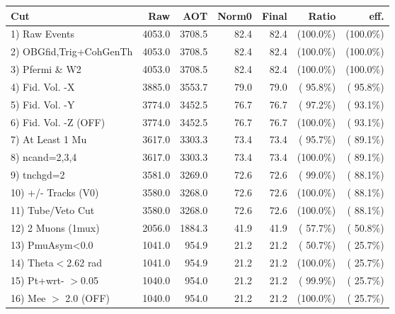 \begin{table}[h!]\centering
 \begin{tabular}{||l||r|r|r|r|r|r||}
 \hline
 \hline
 Cut & Raw & AOT & Norm0 & Final & Ratio & eff.       \\
 \hline
  1) Raw Events           &       4053.0 &       3708.5 &         82.4 &         82.4 & (100.0\%) & (100.0\%) \\
  2) OBGfid,Trig+CohGenTh &       4053.0 &       3708.5 &         82.4 &         82.4 & (100.0\%) & (100.0\%) \\
  3) Pfermi \& W2         &       4053.0 &       3708.5 &         82.4 &         82.4 & (100.0\%) & (100.0\%) \\
  4) Fid. Vol. -X         &       3885.0 &       3553.7 &         79.0 &         79.0 & ( 95.8\%) & ( 95.8\%) \\
  5) Fid. Vol. -Y         &       3774.0 &       3452.5 &         76.7 &         76.7 & ( 97.2\%) & ( 93.1\%) \\
  6) Fid. Vol. -Z (OFF)   &       3774.0 &       3452.5 &         76.7 &         76.7 & (100.0\%) & ( 93.1\%) \\
  7) At Least 1 Mu        &       3617.0 &       3303.3 &         73.4 &         73.4 & ( 95.7\%) & ( 89.1\%) \\
  8) ncand=2,3,4          &       3617.0 &       3303.3 &         73.4 &         73.4 & (100.0\%) & ( 89.1\%) \\
  9) tnchgd=2             &       3581.0 &       3269.0 &         72.6 &         72.6 & ( 99.0\%) & ( 88.1\%) \\
 10) +/- Tracks (V0)      &       3580.0 &       3268.0 &         72.6 &         72.6 & (100.0\%) & ( 88.1\%) \\
 11) Tube/Veto Cut        &       3580.0 &       3268.0 &         72.6 &         72.6 & (100.0\%) & ( 88.1\%) \\
 12) 2 Muons (1mux)       &       2056.0 &       1884.3 &         41.9 &         41.9 & ( 57.7\%) & ( 50.8\%) \\
 13) PmuAsym<0.0          &       1041.0 &        954.9 &         21.2 &         21.2 & ( 50.7\%) & ( 25.7\%) \\
 14) Theta$<$2.62 rad     &       1041.0 &        954.9 &         21.2 &         21.2 & (100.0\%) & ( 25.7\%) \\
 15) Pt+wrt- $>$0.05      &       1040.0 &        954.0 &         21.2 &         21.2 & ( 99.9\%) & ( 25.7\%) \\
 16) Mee $>$ 2.0  (OFF)   &       1040.0 &        954.0 &         21.2 &         21.2 & (100.0\%) & ( 25.7\%) \\

\end{tabular}
\end{table}
